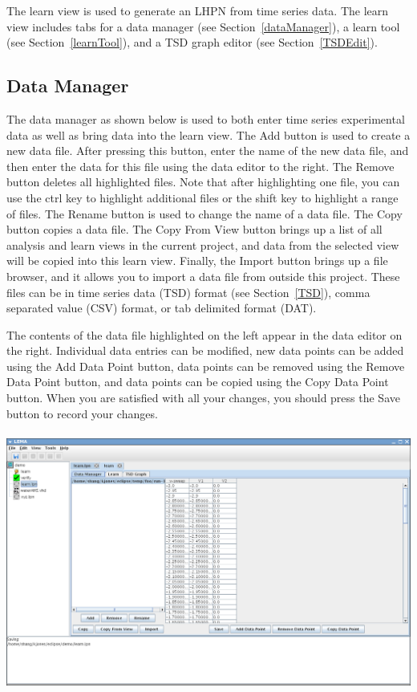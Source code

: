 \documentclass[titlepage,11pt]{article}
\begin{document}
\noindent
The learn view is used to generate an LHPN from time series data. The learn 
view includes tabs for a data manager (see Section~\ref{dataManager}), 
a learn tool (see Section~\ref{learnTool}), and a 
TSD graph editor (see Section~\ref{TSDEdit}).

\subsection{\label{dataManager}Data Manager}

\noindent
The data manager as shown below is used to both enter time series
experimental data as well as bring data
into the learn view.  The Add button is used to create a new data
file. After pressing this button, enter the name of the new data
file, and then enter the data for this file using the data editor
to the right.  The Remove button deletes all highlighted files.
Note that after highlighting one file, you can use the ctrl key
to highlight additional files or the shift key to highlight a
range of files.  The Rename button is used to change the name of a
data file. The Copy button copies a data file. The Copy From View
button brings up a list of all analysis and learn views in the
current project, and data from the selected view will be copied
into this learn view.  Finally, the Import button brings up a file
browser, and it allows you to import a data file from outside
this project.  These files can be in time series data (TSD) format
(see Section~\ref{TSD}), comma separated value (CSV) format, or tab
delimited format (DAT). 

The contents of the data file highlighted on the left appear in the
data editor on the right.  Individual data entries can be modified,
new data points can be added using the Add Data Point button, data 
points can be removed using the Remove Data Point button, and data
points can be copied using the Copy Data Point button.  When you are
satisfied with all your changes, you should press the Save button
to record your changes.
\begin{center}
\includegraphics[height=85mm]{screenshots/dataManagerLema}
\end{center}
\end{document}
